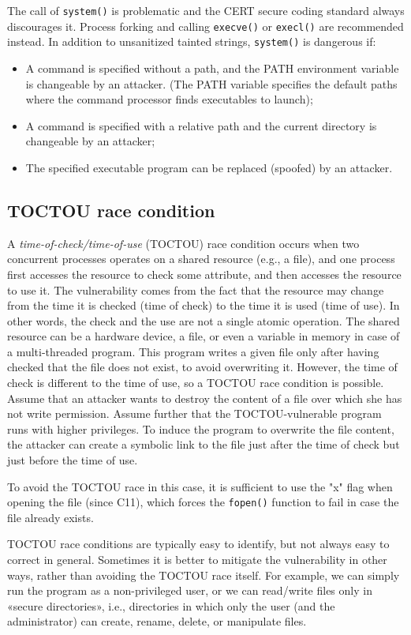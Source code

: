 \documentclass[a4paper,12pt]{article}
\begin{document}
The call of \texttt{system()} is problematic and the CERT secure coding standard always discourages it. Process forking and calling \texttt{execve()} or \texttt{execl()} are recommended instead. In addition to unsanitized tainted strings, \texttt{system()} is dangerous if:
\begin{itemize}
	\item A command is specified without a path, and the PATH environment variable is changeable by an attacker. (The PATH variable specifies the default paths where the command processor finds executables to launch);
	\item A command is specified with a relative path and the current directory is changeable by an attacker;
	\item The specified executable program can be replaced (spoofed) by an attacker.
\end{itemize}

\subsection{TOCTOU race condition}
A \textit{time-of-check/time-of-use} (TOCTOU) race condition occurs when two concurrent processes operates on a shared resource (e.g., a file), and one process first accesses the resource to check some attribute, and then accesses the resource to use it. The vulnerability comes from the fact that the resource may change from the time it is checked (time of check) to the time it is used (time of use). In other words, the check and the use are not a single atomic operation. The shared resource can be a hardware device, a file, or even a variable in memory in case of a multi-threaded program.
This program writes a given file only after having checked that the file does not exist, to avoid overwriting it. However, the time of check is different to the time of use, so a TOCTOU race condition is possible. Assume that an attacker wants to destroy the content of a file over which she has not write permission. Assume further that the TOCTOU-vulnerable program runs with higher privileges. To induce the program to overwrite the file content, the attacker can create a symbolic link to the file just after the time of check but just before the time of use.

To avoid the TOCTOU race in this case, it is sufficient to use the "x" flag when opening the file (since C11), which forces the \texttt{fopen()} function to fail in case the file already exists.

TOCTOU race conditions are typically easy to identify, but not always easy to correct in general. Sometimes it is better to mitigate the vulnerability in other ways, rather than avoiding the TOCTOU race itself. For example, we can simply run the program as a non-privileged user, or we can read/write files only in «secure directories», i.e., directories in which only the user (and the administrator) can create, rename, delete, or manipulate files.
\end{document}
